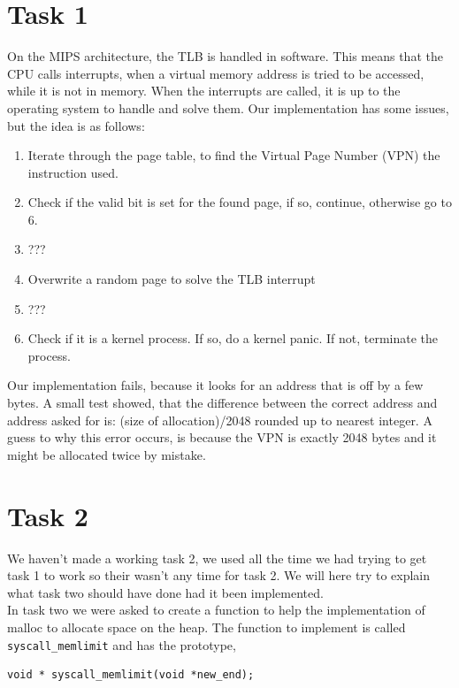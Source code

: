 \documentclass[11pt]{article}
\begin{document}
\section*{Task 1}
On the MIPS architecture, the TLB is handled in software. This means that the CPU calls interrupts, when a virtual memory address is tried to be accessed, while it is not in memory. When the interrupts are called, it is up to the operating system to handle and solve them.
Our implementation has some issues, but the idea is as follows: 
\begin{enumerate}
    \item Iterate through the page table, to find the Virtual Page Number (VPN) the instruction used.
    \item Check if the valid bit is set for the found page, if so, continue, otherwise go to 6.
    \item ???
    \item Overwrite a random page to solve the TLB interrupt
    \item ???
    \item Check if it is a kernel process. If so, do a kernel panic. If not, terminate the process.
\end{enumerate}

Our implementation fails, because it looks for an address that is off by a few bytes. A small test showed, that the difference between the correct address and address asked for is: (size of allocation)/2048 rounded up to nearest integer. A guess to why this error occurs, is because the VPN is exactly 2048 bytes and it might be allocated twice by mistake.

\section*{Task 2}
    We haven't made a working task 2, we used all the time we had trying to get
    task 1 to work so their wasn't any time for task 2.  We will here try to
    explain what task two should have done had it been implemented. \\

    In task two we were asked to create a function to help the implementation of
    malloc to allocate space on the heap.  The function to implement is called
    \texttt{syscall_memlimit} and has the prototype,

    \begin{lstlisting}[style=customc]
void * syscall_memlimit(void *new_end);
    \end{lstlisting}
\end{document}
